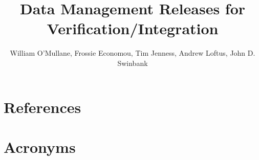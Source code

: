 \documentclass[DM,toc,lsstdraft]{lsstdoc}
\title[DM Releases]{Data Management Releases for Verification/Integration}
\author   {William O'Mullane, Frossie Economou, Tim Jenness, Andrew Loftus, John D. Swinbank}
\begin{document}
%
%
\maketitle

%
%



\section{References\label{sect:references}}
\renewcommand{\refname}{}


\section{Acronyms}
\end{document}
